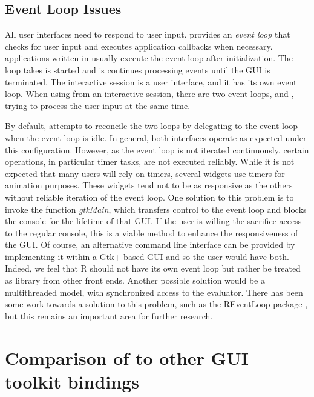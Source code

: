 \documentclass[article]{jss}
\begin{document}
\subsection{Event Loop Issues}

All user interfaces need to respond to user input.  provides
an \emph{event loop} that checks for user input and executes
application callbacks when necessary.  applications written
in  usually execute the  event loop after
initialization. The loop takes is started and is continues processing
events until the GUI is terminated. The interactive 
session is a user interface, and it has its own event loop. When using
 from an interactive session, there are two event loops,
 and , trying to process the user input at the
same
time.

By default,  attempts to reconcile the two loops by
delegating to the  event loop when the  event
loop is idle. In general, both interfaces operate as expected under
this configuration. However, as the  event loop is not
iterated continuously, certain operations, in particular timer tasks,
are not executed reliably. While it is not expected that many
 users will rely on timers, several  widgets use
timers for animation purposes. These widgets tend not to be as
responsive as the others without reliable iteration of the 
event loop. One solution to this problem is to invoke the function
\emph{gtkMain}, which transfers control to the  event loop
and blocks the  console for the lifetime of that GUI.  If
the user is willing the sacrifice access to the regular 
console, this is a viable method to enhance the responsiveness of the
 GUI.  Of course, an alternative command line interface can
be provided by implementing it within a Gtk+-based GUI and so the user
would have both. Indeed, we feel that R should not have its
own event loop but rather be treated as library from other front ends.
Another possible solution would be a multithreaded model, with
synchronized access to the  evaluator. There has been some work towards a solution to this problem, such as the REventLoop package \citep{REventLoop}, but this remains an important area for further research.

\section[Comparison of RGtk2 to other R GUI toolkit
bindings]{Comparison of  to other  GUI toolkit
bindings}\label{sec:comparison}
\end{document}

